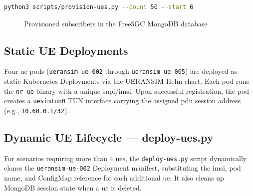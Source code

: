 \begin{lstlisting}[language=bash, caption={Provisioning 50 subscribers starting at index 6}, label={lst:provision_cmd}]
python3 scripts/provision-ues.py --count 50 --start 6
\end{lstlisting}

\begin{figure}[H]
  \centering
  \caption{Provisioned subscribers in the Free5GC MongoDB database}
  \label{fig:mongodb_subscribers}
\end{figure}

\subsection{Static UE Deployments}

Four \gls{ue} pods (\texttt{ueransim-ue-002} through \texttt{ueransim-ue-005}) are deployed as static Kubernetes Deployments via the UERANSIM Helm chart. Each pod runs the \texttt{nr-ue} binary with a unique \gls{supi}/\gls{imsi}. Upon successful registration, the pod creates a \texttt{uesimtun0} TUN interface carrying the assigned \gls{pdu} session address (e.g., \texttt{10.60.0.1/32}).

\subsection{Dynamic UE Lifecycle — deploy-ues.py}
\label{sec:deploy_ues}

For scenarios requiring more than 4 \glspl{ue}, the \texttt{deploy-ues.py} script dynamically clones the \texttt{ueransim-ue-002} Deployment manifest, substituting the \gls{imsi}, pod name, and ConfigMap reference for each additional \gls{ue}. It also cleans up MongoDB session state when a \gls{ue} is deleted.

